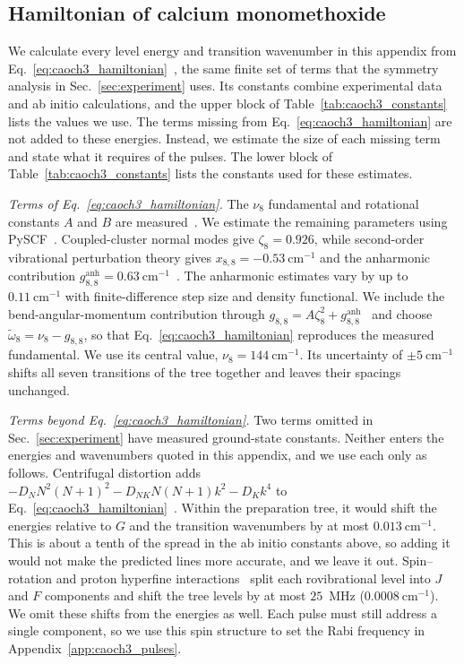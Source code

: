 \subsection{Hamiltonian of calcium monomethoxide}
\label{app:caoch3_ham}

We calculate every level energy and transition wavenumber in this appendix from Eq.~\eqref{eq:caoch3_hamiltonian}~\cite{JohnstonDennison1935,Herzberg1945,Nielsen1951}, the same finite set of terms that the symmetry analysis in Sec.~\ref{sec:experiment} uses. Its constants combine experimental data and ab initio calculations, and the upper block of Table~\ref{tab:caoch3_constants} lists the values we use. The terms missing from Eq.~\eqref{eq:caoch3_hamiltonian} are not added to these energies. Instead, we estimate the size of each missing term and state what it requires of the pulses. The lower block of Table~\ref{tab:caoch3_constants} lists the constants used for these estimates.

\emph{Terms of Eq.~\eqref{eq:caoch3_hamiltonian}.} The $\nu_8$ fundamental and rotational constants $A$ and $B$ are measured~\cite{Jacox2003,Kozyryev2019,Namiki1998,Crozet2002}. We estimate the remaining parameters using PySCF~\cite{Sun2020PySCF}. Coupled-cluster normal modes give $\zeta_8=0.926$, while second-order vibrational perturbation theory gives $x_{8,8}=-0.53\ \mathrm{cm^{-1}}$ and the anharmonic contribution $g^{\mathrm{anh}}_{8,8}=0.63\ \mathrm{cm^{-1}}$~\cite{Nielsen1951,Watson1968}. The anharmonic estimates vary by up to $0.11\ \mathrm{cm^{-1}}$ with finite-difference step size and density functional. We include the bend-angular-momentum contribution through $g_{8,8}=A\zeta_8^2+g^{\mathrm{anh}}_{8,8}$~\cite{Watson1968} and choose $\tilde\omega_8=\nu_8-g_{8,8}$, so that Eq.~\eqref{eq:caoch3_hamiltonian} reproduces the measured fundamental. We use its central value, $\nu_8=144\ \mathrm{cm^{-1}}$. Its uncertainty of $\pm5\ \mathrm{cm^{-1}}$ shifts all seven transitions of the tree together and leaves their spacings unchanged.

\emph{Terms beyond Eq.~\eqref{eq:caoch3_hamiltonian}.} Two terms omitted in Sec.~\ref{sec:experiment} have measured ground-state constants. Neither enters the energies and wavenumbers quoted in this appendix, and we use each only as follows. Centrifugal distortion adds $-D_NN^2(N+1)^2-D_{NK}N(N+1)k^2-D_Kk^4$ to Eq.~\eqref{eq:caoch3_hamiltonian}~\cite{Namiki1998,Crozet2002}. Within the preparation tree, it would shift the energies relative to $G$ and the transition wavenumbers by at most $0.013\ \mathrm{cm^{-1}}$. This is about a tenth of the spread in the ab initio constants above, so adding it would not make the predicted lines more accurate, and we leave it out. Spin--rotation and proton hyperfine interactions~\cite{Namiki1998} split each rovibrational level into $J$ and $F$ components and shift the tree levels by at most $25$~MHz ($0.0008\ \mathrm{cm^{-1}}$). We omit these shifts from the energies as well. Each pulse must still address a single component, so we use this spin structure to set the Rabi frequency in Appendix~\ref{app:caoch3_pulses}.

